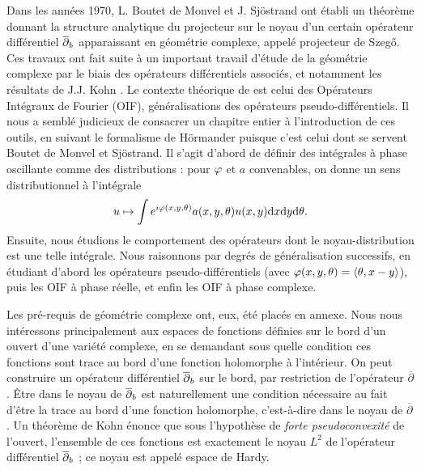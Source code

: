 Dans les années 1970, L. Boutet de Monvel et J. Sj\"ostrand
\cite{BoutetdeMonvel1975} ont établi un théorème donnant la structure
analytique du projecteur sur le noyau d'un certain opérateur
différentiel $\overline{\partial}_b$ apparaissant en géométrie complexe, appelé
projecteur de Szeg\H{o}. Ces travaux ont fait suite à un important
travail d'étude de la géométrie complexe par le biais des opérateurs
différentiels associés, et notamment les résultats de J.J. Kohn
\cite{kohn1965extension}. Le contexte théorique de
\cite{BoutetdeMonvel1975} est celui des Opérateurs Intégraux de
Fourier (OIF), généralisations des opérateurs pseudo-différentiels. Il nous a
semblé judicieux de consacrer un chapitre entier à l'introduction de
ces outils, en suivant le formalisme de H\"ormander
\cite{hormander2007, hormander1985,hormander2003analysis} puisque c'est celui dont se servent Boutet de Monvel et Sj\"ostrand. Il s'agit d'abord de définir des intégrales à phase oscillante comme des distributions : pour $\varphi$ et $a$ convenables, on donne un sens distributionnel à l'intégrale
\begin{equation*}
	u \mapsto \int e^{i\varphi(x,y,\theta)}a(x,y,\theta)u(x,y)\mathrm{d}
        x\mathrm{d} y\mathrm{d} \theta.
\end{equation*}
Ensuite, nous étudions le comportement des opérateurs dont le noyau-distribution est une telle intégrale. Nous raisonnons par degrés de généralisation successifs, en étudiant d'abord les opérateurs pseudo-différentiels (avec $\varphi(x,y,\theta)=\langle \theta, x-y \rangle $), puis les OIF à phase réelle, et enfin les OIF à phase complexe.

Les pré-requis de géométrie complexe ont, eux, été placés en
annexe. Nous nous intéressons principalement aux espaces de fonctions
définies sur le bord d'un ouvert d'une variété complexe, en se
demandant sous quelle condition ces fonctions sont trace au bord d'une
fonction holomorphe à l'intérieur. On peut construire un opérateur
différentiel $\overline{\partial}_b$ sur le bord, par restriction de l'opérateur
$\overline{\partial}$. Être dans le noyau de $\overline{\partial}_b$ est naturellement
une condition nécessaire au fait d'être la trace au bord d'une
fonction holomorphe, c'est-à-dire dans le noyau de
$\overline{\partial}$. Un théorème de Kohn \cite{kohn1965extension}
énonce que sous l'hypothèse de \emph{forte pseudoconvexité} de l'ouvert, l'ensemble de ces fonctions est exactement le noyau $L^2$ de l'opérateur différentiel $\overline{\partial}_b$ ; ce noyau est appelé espace de Hardy.

